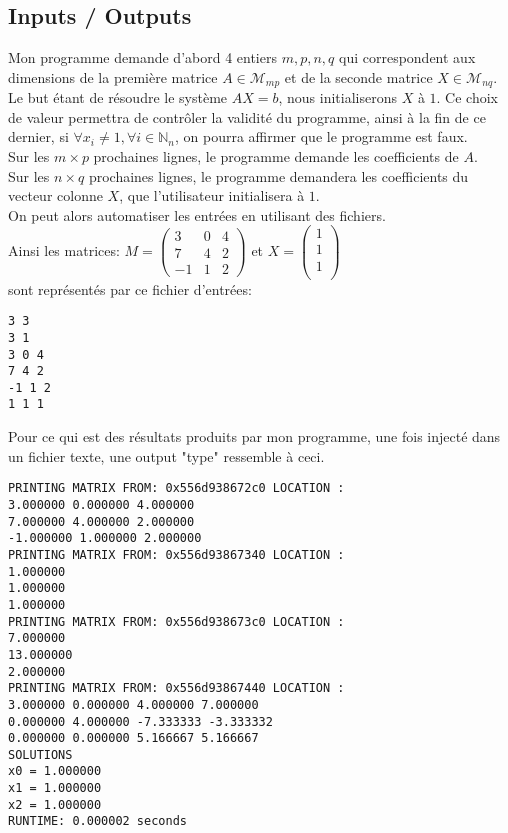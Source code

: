 \subsection{Inputs / Outputs}
Mon programme demande d'abord 4 entiers $m,p,n,q$ qui correspondent aux dimensions de la première matrice $A \in \mathcal{M}_{mp}$ et de la seconde matrice $X \in \mathcal{M}_{nq}$. Le but étant de résoudre le système $AX=b$, nous initialiserons $X$ à $1$. Ce choix de valeur permettra de contrôler la validité du programme, ainsi à la fin de ce dernier, si $\forall x_i \neq 1, \forall i \in \mathbb{N}_{n}$, on pourra affirmer que le programme est faux.  \\
Sur les $m\times p$ prochaines lignes, le programme demande les coefficients de $A$. \\
Sur les $n \times q$ prochaines lignes, le programme demandera les coefficients du vecteur colonne $X$, que l'utilisateur initialisera à $1$. \\
On peut alors automatiser les entrées en utilisant des fichiers.\vspace{6pt} \\
Ainsi les matrices:
$ M = \begin{pmatrix}
3 & 0 & 4\\
7 & 4 & 2 \\
-1 & 1 & 2
\end{pmatrix}
$
et 
$ X = \begin{pmatrix}
1 \\
1 \\
1 \\
\end{pmatrix}
$ \vspace{6pt}  \\
sont représentés par ce fichier d'entrées:
\begin{lstlisting}[caption=input.txt, basicstyle=\fontsize{8}{10}\selectfont]
3 3
3 1 
3 0 4
7 4 2
-1 1 2
1 1 1
\end{lstlisting}
Pour ce qui est des résultats produits par mon programme, une fois injecté dans un fichier texte, une output "type" ressemble à ceci. \\
\begin{lstlisting}[caption=Gauss elimination with M and X matrix, basicstyle=\fontsize{8}{10}\selectfont]
PRINTING MATRIX FROM: 0x556d938672c0 LOCATION :
3.000000 0.000000 4.000000
7.000000 4.000000 2.000000
-1.000000 1.000000 2.000000
PRINTING MATRIX FROM: 0x556d93867340 LOCATION :
1.000000
1.000000
1.000000
PRINTING MATRIX FROM: 0x556d938673c0 LOCATION :
7.000000
13.000000
2.000000
PRINTING MATRIX FROM: 0x556d93867440 LOCATION :
3.000000 0.000000 4.000000 7.000000
0.000000 4.000000 -7.333333 -3.333332
0.000000 0.000000 5.166667 5.166667
SOLUTIONS
x0 = 1.000000
x1 = 1.000000
x2 = 1.000000
RUNTIME: 0.000002 seconds 
\end{lstlisting}
